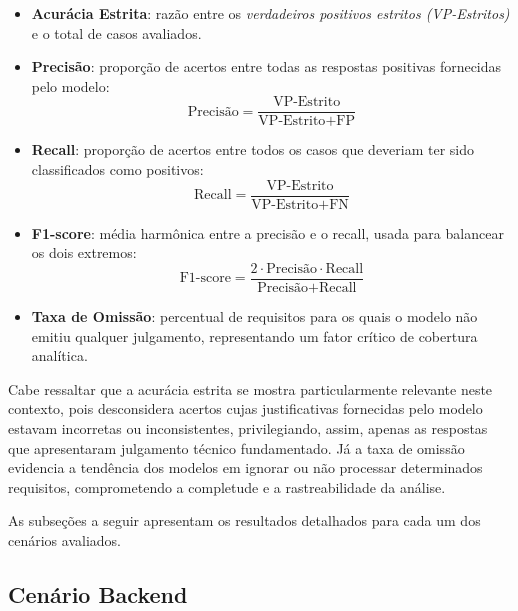 \begin{itemize}
    \item \textbf{Acurácia Estrita}: razão entre os \textit{verdadeiros positivos estritos (VP-Estritos)} e o total de casos avaliados.
    
    \item \textbf{Precisão}: proporção de acertos entre todas as respostas positivas fornecidas pelo modelo:
    \begin{equation}
        \text{Precisão} = \frac{\text{VP-Estrito}}{\text{VP-Estrito} + \text{FP}}
    \end{equation}
    
    \item \textbf{Recall}: proporção de acertos entre todos os casos que deveriam ter sido classificados como positivos:
    \begin{equation}
        \text{Recall} = \frac{\text{VP-Estrito}}{\text{VP-Estrito} + \text{FN}}
    \end{equation}
    
    \item \textbf{F1-score}: média harmônica entre a precisão e o recall, usada para balancear os dois extremos:
    \begin{equation}
        \text{F1-score} = \frac{2 \cdot \text{Precisão} \cdot \text{Recall}}{\text{Precisão} + \text{Recall}}
    \end{equation}
        
    \item \textbf{Taxa de Omissão}: percentual de requisitos para os quais o modelo não emitiu qualquer julgamento, representando um fator crítico de cobertura analítica.
\end{itemize}
Cabe ressaltar que a acurácia estrita se mostra particularmente relevante neste contexto, pois desconsidera acertos cujas justificativas fornecidas pelo modelo estavam incorretas ou inconsistentes, privilegiando, assim, apenas as respostas que apresentaram julgamento técnico fundamentado. Já a taxa de omissão evidencia a tendência dos modelos em ignorar ou não processar determinados requisitos, comprometendo a completude e a rastreabilidade da análise.

As subseções a seguir apresentam os resultados detalhados para cada um dos cenários avaliados.

\subsection{Cenário Backend}


